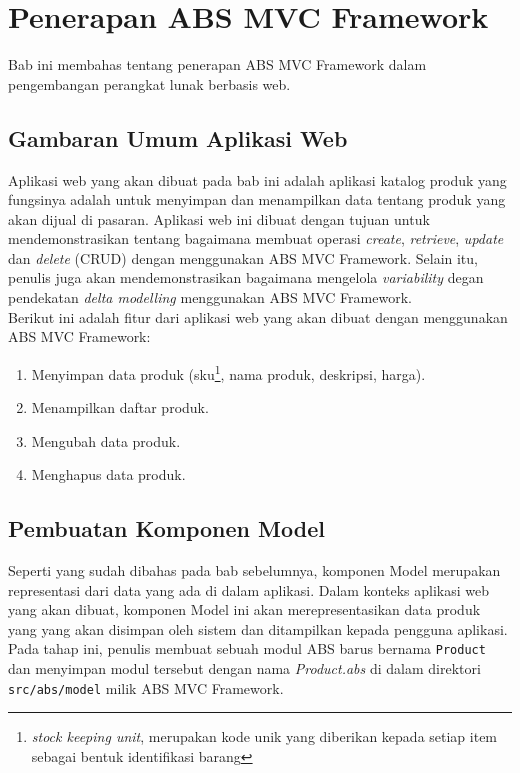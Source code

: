 \chapter{Penerapan ABS MVC Framework}

Bab ini membahas tentang penerapan ABS MVC Framework dalam pengembangan perangkat lunak berbasis web.

\section{Gambaran Umum Aplikasi Web}
Aplikasi web yang akan dibuat pada bab ini adalah aplikasi katalog produk yang fungsinya adalah untuk menyimpan dan menampilkan data tentang produk yang akan dijual di pasaran. Aplikasi web ini dibuat dengan tujuan untuk mendemonstrasikan tentang bagaimana membuat operasi \textit{create}, \textit{retrieve}, \textit{update} dan \textit{delete} (CRUD) dengan menggunakan ABS MVC Framework. Selain itu, penulis juga akan mendemonstrasikan bagaimana mengelola \textit{variability} degan pendekatan \textit{delta modelling} menggunakan ABS MVC Framework.\\

Berikut ini adalah fitur dari aplikasi web yang akan dibuat dengan menggunakan ABS MVC Framework:

\begin{enumerate}
    \item Menyimpan data produk (sku\footnote{\textit{stock keeping unit}, merupakan kode unik yang diberikan kepada setiap item sebagai bentuk identifikasi barang}, nama produk, deskripsi, harga).
    \item Menampilkan daftar produk.
    \item Mengubah data produk.
    \item Menghapus data produk.
\end{enumerate}

\section{Pembuatan Komponen Model}

Seperti yang sudah dibahas pada bab sebelumnya, komponen Model merupakan representasi dari data yang ada di dalam aplikasi. Dalam konteks aplikasi web yang akan dibuat, komponen Model ini akan merepresentasikan data produk yang yang akan disimpan oleh sistem dan ditampilkan kepada pengguna aplikasi. Pada tahap ini, penulis membuat sebuah modul ABS barus bernama \texttt{Product} dan menyimpan modul tersebut dengan nama \textit{Product.abs} di dalam direktori \texttt{src/abs/model} milik ABS MVC Framework.\\


